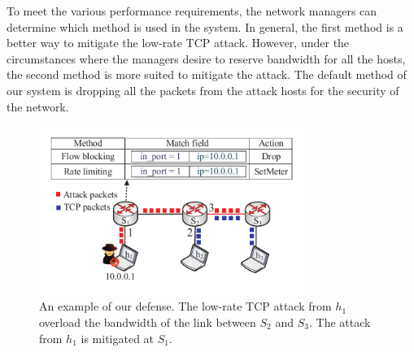 To meet the various performance requirements, the network managers can determine which method is used in the system. In general, the first method is a better way to mitigate the low-rate TCP attack. However, under the circumstances where the managers desire to reserve bandwidth for all the hosts, the second method is more suited to mitigate the attack. The default method of our system is dropping all the packets from the attack hosts for the security of the network. 



\begin{figure}
\vspace{-0.1in}
\centering
\includegraphics[width=3.4in]{Design/defense.pdf}
\vspace{-0.1in}
\caption{\small{An example of our defense. The low-rate TCP attack from $h_1$ overload the bandwidth of the link between $S_2$ and $S_3$. The attack from $h_1$ is mitigated at $S_1$.}}
\label{fig:mitigate}
\vspace{-0.2in}
\end{figure}


